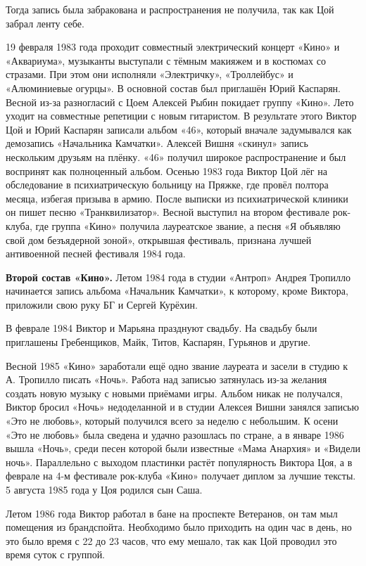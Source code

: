 Тогда запись была забракована и распространения не получила, так как Цой забрал ленту себе.

19 февраля 1983 года проходит совместный электрический концерт «Кино» и «Аквариума», музыканты выступали с тёмным макияжем и в костюмах со стразами. При этом они исполняли «Электричку», «Троллейбус» и «Алюминиевые огурцы». В основной состав был приглашён Юрий Каспарян. Весной из-за разногласий с Цоем Алексей Рыбин покидает группу «Кино». Лето уходит на совместные репетиции с новым гитаристом. В результате этого Виктор Цой и Юрий Каспарян записали альбом «46», который вначале задумывался как демозапись «Начальника Камчатки». Алексей Вишня «скинул» запись нескольким друзьям на плёнку. «46» получил широкое распространение и был воспринят как полноценный альбом. Осенью 1983 года Виктор Цой лёг на обследование в психиатрическую больницу на Пряжке, где провёл полтора месяца, избегая призыва в армию. После выписки из психиатрической клиники он пишет песню «Транквилизатор». Весной выступил на втором фестивале рок-клуба, где группа «Кино» получила лауреатское звание, а песня «Я объявляю свой дом безъядерной зоной», открывшая фестиваль, признана лучшей антивоенной песней фестиваля 1984 года.



\textbf{Второй состав «Кино».}
Летом 1984 года в студии «Антроп» Андрея Тропилло начинается запись альбома «Начальник Камчатки», к которому, кроме Виктора, приложили свою руку БГ и Сергей Курёхин.

В феврале 1984 Виктор и Марьяна празднуют свадьбу. На свадьбу были приглашены Гребенщиков, Майк, Титов, Каспарян, Гурьянов и другие.

Весной 1985 «Кино» заработали ещё одно звание лауреата и засели в студию к А. Тропилло писать «Ночь». Работа над записью затянулась из-за желания создать новую музыку с новыми приёмами игры. Альбом никак не получался, Виктор бросил «Ночь» недоделанной и в студии Алексея Вишни занялся записью «Это не любовь», который получился всего за неделю с небольшим. К осени «Это не любовь» была сведена и удачно разошлась по стране, а в январе 1986 вышла «Ночь», среди песен которой были известные «Мама Анархия» и «Видели ночь». Параллельно с выходом пластинки растёт популярность Виктора Цоя, а в феврале на 4-м фестивале рок-клуба «Кино» получает диплом за лучшие тексты. 5 августа 1985 года у Цоя родился сын Саша.


Летом 1986 года Виктор работал в бане на проспекте Ветеранов, он там мыл помещения из брандспойта. Необходимо было приходить на один час в день, но это было время с 22 до 23 часов, что ему мешало, так как Цой проводил это время суток с группой.

